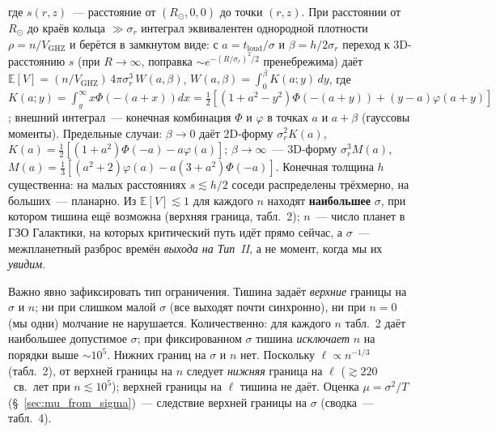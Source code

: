 \documentclass[12pt,a4paper]{article}
\begin{document}
где $s(r,z)$~--- расстояние от $(R_\odot,0,0)$ до точки $(r,z)$. При расстоянии от $R_\odot$ до краёв кольца $\gg\sigma_r$ интеграл эквивалентен однородной плотности $\rho=n/V_{\mathrm{GHZ}}$ и берётся в замкнутом виде: с $a=t_{\mathrm{loud}}/\sigma$ и $\beta=h/2\sigma_r$ переход к 3D-расстоянию $s$ (при $R\to\infty$, поправка $\sim e^{-(R/\sigma_r)^2/2}$ пренебрежима) даёт $\mathbb{E}[V]=(n/V_{\mathrm{GHZ}})\,4\pi\sigma_r^3\,W(a,\beta)$, $W(a,\beta)=\int_0^\beta K(a;y)\,dy$, где $K(a;y)=\int_y^\infty x\Phi(-(a+x))dx=\tfrac12[(1+a^2-y^2)\Phi(-(a+y))+(y-a)\varphi(a+y)]$; внешний интеграл~--- конечная комбинация $\Phi$ и $\varphi$ в точках $a$ и $a+\beta$ (гауссовы моменты). Предельные случаи: $\beta\to0$ даёт 2D-форму $\sigma_r^2 K(a)$, $K(a)=\tfrac12[(1+a^2)\Phi(-a)-a\varphi(a)]$; $\beta\to\infty$~--- 3D-форму $\sigma_r^3 M(a)$, $M(a)=\tfrac13[(a^2+2)\varphi(a)-a(3+a^2)\Phi(-a)]$. Конечная толщина $h$ существенна: на малых расстояниях $s \lesssim h/2$ соседи распределены трёхмерно, на больших~--- планарно. Из $\mathbb{E}[V]\lesssim 1$ для каждого $n$ находят \textbf{наибольшее} $\sigma$, при котором тишина ещё возможна (верхняя граница, табл.~2); $n$~--- число планет в ГЗО Галактики, на которых критический путь идёт прямо сейчас, а $\sigma$~--- межпланетный разброс времён \emph{выхода на Тип~II}, а не момент, когда мы их \emph{увидим}.

Важно явно зафиксировать тип ограничения. Тишина задаёт \emph{верхние} границы на $\sigma$ и $n$; ни при слишком малой $\sigma$ (все выходят почти синхронно), ни при $n=0$ (мы одни) молчание не нарушается. Количественно: для каждого $n$ табл.~2 даёт наибольшее допустимое $\sigma$; при фиксированном $\sigma$ тишина \emph{исключает} $n$ на порядки выше $\sim10^5$. Нижних границ на $\sigma$ и $n$ нет. Поскольку $\ell \propto n^{-1/3}$ (табл.~2), от верхней границы на $n$ следует \emph{нижняя} граница на $\ell$ ($\gtrsim 220$~св.~лет при $n \lesssim 10^5$); верхней границы на $\ell$ тишина не даёт. Оценка $\mu=\sigma^2/T$ (\S~\ref{sec:mu_from_sigma})~--- следствие верхней границы на $\sigma$ (сводка~--- табл.~4).
\end{document}
